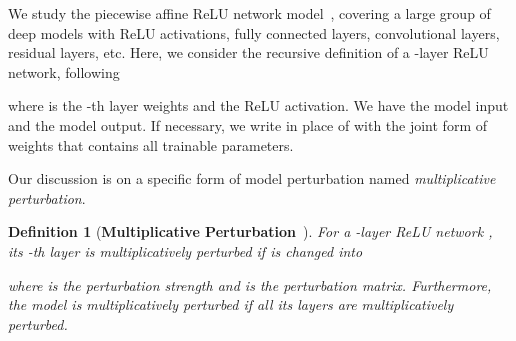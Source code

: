 \documentclass{article} \usepackage{iclr2022_conference,times}
\newtheorem{definition}{Definition}
\begin{document}
We study the piecewise affine ReLU network model~\citep{AroraBMM18}, covering a large group of deep models with ReLU activations, fully connected layers, convolutional layers, residual layers, etc. Here, we consider the recursive definition of a -layer ReLU network, following

where  is the -th layer weights and  the ReLU activation. We have  the model input and  the model output. If necessary, we write  in place of  with the joint form of weights  that contains all trainable parameters. 

Our discussion is on a specific form of model perturbation named \emph{multiplicative perturbation}.
\begin{definition}[\textbf{Multiplicative Perturbation}~\citep{PetzkaKASB21}]
For a -layer ReLU network , its -th layer is multiplicatively perturbed if  is changed into

where  is the perturbation strength and  is the perturbation matrix. Furthermore, the model  is multiplicatively perturbed if all its layers are multiplicatively perturbed.
\end{definition}
\end{document}
